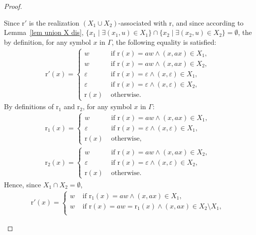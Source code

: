 \documentclass[a4paper]{llncs}
\begin{document}
\begin{proof}
\begin{enumerate}
      Since $\mathrm{r}'$ is the realization $(X_1\cup X_2)$-associated with $\mathrm{r}$, and since according to Lemma~\ref{lem union X dis}, $\{x_1\mid \exists (x_1,u)\in X_1\} \cap \{x_2\mid \exists (x_2,u)\in X_2\}=\emptyset$, the by definition, for any symbol $x$ in $\Gamma$, the following equality is satisfied:
        \begin{align*}
        \mathrm{r}'(x)=
        \begin{cases}
            w & \text{ if } \mathrm{r}(x)=aw \wedge (x,ax)\in X_1,\\
            w & \text{ if } \mathrm{r}(x)=aw \wedge (x,ax)\in X_2,\\
            \varepsilon & \text{ if } \mathrm{r}(x)=\varepsilon \wedge (x,\varepsilon)\in X_1,\\
            \varepsilon & \text{ if } \mathrm{r}(x)=\varepsilon \wedge (x,\varepsilon)\in X_2,\\
            \mathrm{r}(x) & \text{ otherwise.}
          \end{cases}
        \end{align*}    
    By definitions of $\mathrm{r}_1$ and $\mathrm{r}_2$,  for any symbol $x$ in $\Gamma$:
        \begin{align*}
        \mathrm{r}_1(x)=
        \begin{cases}
            w & \text{ if } \mathrm{r}(x)=aw \wedge (x,ax)\in X_1,\\
            \varepsilon & \text{ if } \mathrm{r}(x)=\varepsilon \wedge (x,\varepsilon)\in X_1,\\
            \mathrm{r}(x) & \text{ otherwise,}
          \end{cases}\\
        \mathrm{r}_2(x)=
        \begin{cases}
            w & \text{ if } \mathrm{r}(x)=aw \wedge (x,ax)\in X_2,\\
            \varepsilon & \text{ if } \mathrm{r}(x)=\varepsilon \wedge (x,\varepsilon)\in X_2,\\
            \mathrm{r}(x) & \text{ otherwise.}
          \end{cases}
        \end{align*}    
    Hence, since $X_1\cap X_2=\emptyset$,
        \begin{align*}
        \mathrm{r}'(x)=
        \begin{cases}
            w & \text{ if } \mathrm{r}_1(x)=aw \wedge (x,ax)\in X_1,\\
            w & \text{ if } \mathrm{r}(x)=aw=\mathrm{r}_1(x) \wedge (x,ax)\in X_2\setminus X_1,\\

\end{cases}
\end{align*}
\end{enumerate}
\end{proof}
\end{document}

